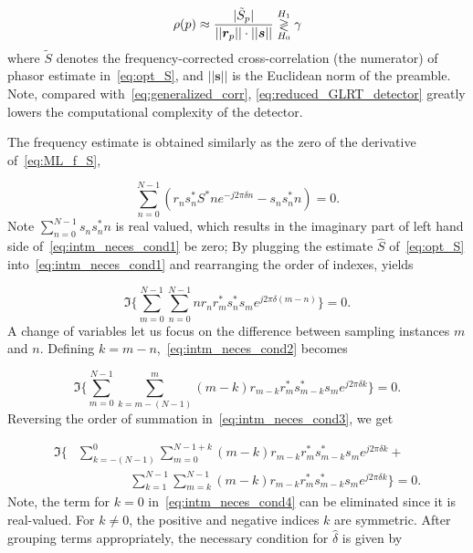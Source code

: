 \begin{equation}
  \label{eq:reduced_GLRT_detector}
  \rho(p) \approx
  \frac{|\tilde{S}_p|}
  {||\bm{r}_{p}||\cdot||\bm{s}||} \mathrel{\mathop\gtrless\limits^{H_1}_{H_0}} \gamma
\end{equation}
where $\tilde{S}$ denotes the frequency-corrected cross-correlation (the numerator)
of phasor estimate in~\eqref{eq:opt_S}, and $||\bm{s}||$ is the Euclidean norm of the preamble. 
Note, compared with~\eqref{eq:generalized_corr},
\eqref{eq:reduced_GLRT_detector} greatly lowers the computational complexity of the detector.

The frequency estimate is obtained similarly as the zero of the
derivative of~\eqref{eq:ML_f_S},

\begin{equation}
    \label{eq:intm_neces_cond1}
    \sum_{n=0}^{N-1}{(r_{n}s_n^{*}S^{*}ne^{-j2\pi \delta n}-s_ns_n^{*}n)=0}.
    \end{equation}
Note $\sum_{n=0}^{N-1}{s_ns_n^{*}n}$ is real
valued, which results in the imaginary part of left hand side of~\eqref{eq:intm_neces_cond1} be zero;
By plugging the estimate $\hat{S}$ of~\eqref{eq:opt_S} into~\eqref{eq:intm_neces_cond1} and rearranging the order of indexes, yields

\begin{equation}
    \label{eq:intm_neces_cond2}
    \Im\bigg\{\sum_{m=0}^{N-1}{\sum_{n=0}^{N-1}{nr_{n}r_{m}^{*}s_n^{*}s_me^{j2\pi \delta(m-n)}}}\bigg\} = 0.
  \end{equation}
A change of variables let us focus on the difference between sampling instances $m$ and $n$.
Defining $k{=}m-n$,~\eqref{eq:intm_neces_cond2} becomes

\begin{equation}
    \label{eq:intm_neces_cond3}
    \Im\bigg\{\sum_{m=0}^{N-1}{\sum_{k{=}m-(N-1)}^{m}{(m{-}k)r_{m-k}r_{m}^{*}s_{m-k}^{*}s_me^{j2\pi \delta k}}}\bigg\}=0.
  \end{equation}
Reversing the order of summation in~\eqref{eq:intm_neces_cond3}, we get

\begin{equation}
    \begin{aligned}
    \label{eq:intm_neces_cond4}
    \Im\bigg\{&\sum_{k=-(N-1)}^{0}\sum_{m=0}^{N-1+k}{(m{-}k)r_{m-k}r_{m}^{*}s_{m-k}^{*}s_me^{j2\pi \delta k}+}\\
    &\quad~~~~~~~~~~~~~~\sum_{k=1}^{N-1}\sum_{m=k}^{N-1}{(m{-}k)r_{m-k}r_{m}^{*}s_{m-k}^{*}s_me^{j2\pi \delta k}}\bigg\}= 0.
    \end{aligned}
  \end{equation}
Note, the term for $k{=}0$ in~\eqref{eq:intm_neces_cond4} can be eliminated since it is real-valued. For $k \neq 0$, the positive and negative indices $k$ are symmetric. 
After grouping terms appropriately, the necessary condition for $\hat{\delta}$ is given by

